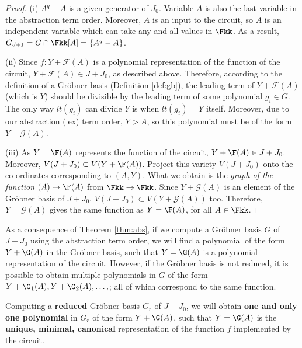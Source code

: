 \begin{proof}
(i) $A^q -A$ is a given generator of $J_0$. Variable $A$ is also the
  last variable in the abstraction term order. Moreover, $A$ is an
  input to the circuit, so $A$ is an independent variable which can
  take any and all values in $\Fkk$. As a   result, $G_{d+1} = G \cap
  \Fkk[A] = \{A^q - A\}$.

(ii) Since $f:Y + {\mathcal{F}}(A)$ is a polynomial representation of
  the function of the circuit, $Y + {\mathcal{F}}(A) \in J + J_0$, as
  described above. Therefore, according to the definition of a
  Gr\"obner basis (Definition \ref{def:gb}), the leading term of $Y +
  {\mathcal{F}}(A)$ (which is $Y$) should be divisible by the leading
  term of some polynomial $g_i \in G$. The only way $lt(g_i)$ can
  divide $Y$ is when $lt(g_i) = Y$ itself. Moreover, due to our
  abstraction (lex) term order, $Y > A$, so this polynomial must be
  of the form $Y + {\mathcal{G}}(A)$. 

(iii) As $Y = \F(A)$ represents the function of the circuit, $Y +
  \F(A) \in J + J_0$. Moreover, $V(J + J_0) \subset V(Y + \F(A))$. 
  Project this variety $V(J + J_0)$ onto the co-ordinates
  corresponding to $(A, Y)$. What we obtain is the {\it graph of the
  function} $(A) \mapsto \F(A)$ from $\Fkk \rightarrow \Fkk$. Since $Y
  + {\mathcal{G}}(A)$ is an element of the Gr\"obner basis of $J +
  J_0$, $V(J + J_0) \subset V(Y + {\mathcal{G}}(A))$ too. Therefore,
  $Y = {\mathcal{G}}(A)$ gives the same function as $Y = \F(A)$, for
  all $A \in \Fkk$.
\end{proof}

As a consequence of Theorem \ref{thm:abs}, if we compute a Gr\"obner
basis $G$ of $J + J_0$ using the abstraction term order, we will find
a polynomial of the form $Y + \G(A)$ in the Gr\"obner basis, such that
$Y = \G(A)$ is a polynomial representation of the circuit. However, if
the Gr\"obner basis is not reduced, it is possible to obtain multiple
polynomials in $G$ of the form $Y + \G _1(A), Y + \G _2(A), \dots,$;
all of which correspond to the same function. 

\begin{Corollary}
Computing a {\bf reduced} Gr\"obner basis $G_r$ of $J + J_0$, we
will obtain {\bf one and only one polynomial} in $G_r$ of the form $Y
+ \G(A)$, such that $Y = \G(A)$ is the {\bf unique, minimal,
  canonical} representation of the function $f$ implemented by the
circuit.  
\end{Corollary}

